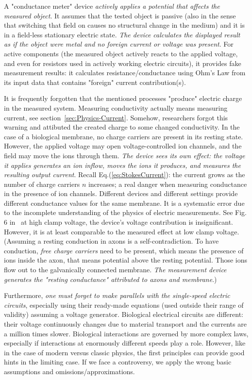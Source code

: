 A "conductance meter" device \textit{actively applies a potential
that affects the measured object}. It assumes that the tested
object is passive (also in the sense that switching that field on
causes no structural change in the medium) and it is in a field-less
stationary electric state. \textit{The device calculates the displayed result
as if the object were metal and no foreign current or voltage was
present}. For active components (the measured object actively reacts
to the applied voltage, and even for resistors used in actively working
electric circuits), it provides fake measurement results: it calculates
resistance/conductance using Ohm's Law from its input data that contains
"foreign" current contribution(s).

It is frequently forgotten that the mentioned processes "produce"
electric charge in the measured system. Measuring conductivity actually means measuring current, see section~\ref{sec:Physics-Current}. Somehow, researchers forgot
this warning and attibuted the created charge to some changed conductivity.
In the case of a biological membrane, no charge carriers are present
in its resting state. However, the applied voltage may open voltage-controlled
ion channels, and the field may move the ions through them. \textit{The
device sees its own effect: the voltage it applies generates an ion inflow,
moves the ions it produces, and measures the resulting output current}.
Recall Eq.(\ref{eq:StokesCurrent}): the current grows as the number of charge carriers $n$ increases; a real danger when measuring conductance in the presence of ion channels.
Different devices and different settings provide different conductance
values for the same membrane.
It is a systematic error due to the incomplete understanding of the physics
of electric measurements. See Fig. 6 in~\cite{HodgkinHuxley:1952}
at high clamp voltage, the device's voltage contribution is insignificant.
However, it is at least comparable to the measured effect at low clamp
voltage.
(Assuming a resting conduction in
axons is a self-contradiction. To have conduction, \textit{free charge carriers}
need to be present, which means the presence of ions inside the axon, that means potential
above the resting potential. Those ions flow out to the galvanically
connected membrane. \textit{The measurement device generates the "resting conductance"
attributed to axons and membrane}.)


Furthermore, \textit{one must forget to make parallels with the single-speed
electric circuits}, especially using their ready-made equations (used
outside their range of validity) assuming a voltage generator.
\hypertarget{Biologicalcircuits}{Biological electrical circuits} are different: their voltage continuously changes 
due to material transport and the currents are a million times slower. Biological interactions are governed
by more complex laws, especially if interactions at enormously different
speeds play a role. However, like in the case of modern versus classic
physics, the first principles can provide good hints in the limiting
case. If we face a controversy, we apply the wrong basic assumptions
and omissions/approximations.


